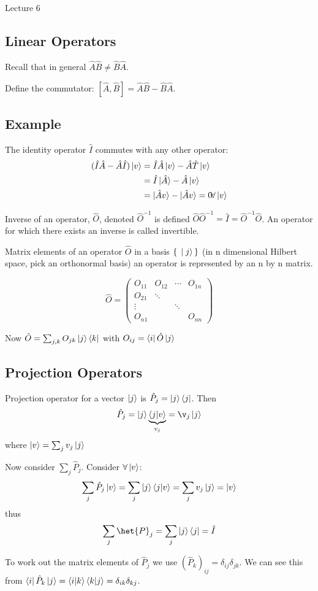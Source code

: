 \begin{center}

Lecture 6

\end{center}

\subsection{Linear Operators}

Recall that in general $\hat{A}\hat{B} \neq \hat{B}\hat{A}$.

Define the commutator: $[\hat{A}, \hat{B}] = \hat{A}\hat{B} - \hat{B}\hat{A}$.

\subsection{Example}

The identity operator $\hat{I}$ commutes with any other operator: 
\begin{align*}
(\hat{I}\hat{A} - \hat{A}\hat{I})\ket{v} &= \hat{I}\hat{A}\ket{v} - \hat{A}\hat{T}\ket{v} \\
&= \hat{I} \ket{\hat{A}} - \hat{A}\ket{v} \\
&= \ket{\hat{A} v} - \ket{\hat{A} v} = 0 \! \forall \ket{v}
\end{align*}

Inverse of an operator, $\hat{O}$, denoted $\hat{O}^{-1}$ is defined $\hat{O}\hat{O}^{-1} = \hat{I} = \hat{O}^{-1} \hat{O}$. An operator for which there exists an inverse is called invertible.

Matrix elements of an operator $\hat{O}$ in a basis $\set{\ket{j}}$ (in n dimensional Hilbert space, pick an orthonormal basis) an operator is represented by an n by n matrix.

\[\hat{O}=\begin{pmatrix}
O_{11} & O_{12} & \cdots & O_{1n} \\
O_{21} & \ddots & & \\
\vdots & & \ddots &  \\
O_{n1} & & & O_{nn}
\end{pmatrix}
\]

Now $\hat{O} = \sum_{j,k} O_{jk} \ket{j}\bra{k}$ with $O_{ij} = \bra{i}\hat{O}\ket{j}$

\subsection{Projection Operators}

Projection operator for a vector $\ket{j}$ is $\hat{P}_{j} = \ket{j} \bra{j}$. Then $$\hat{P}_j = \ket{j} \underbrace{\braket{j|v}}_{v_j} = \v_j \ket{j}$$ where $\ket{v} = \sum_j v_j \ket{j}$

Now consider $\sum_j \hat{P}_j$. Consider $\forall \ket{v}$: $$\sum_j \hat{P}_j \ket{v} = \sum_j \ket{j} \braket{j|v} = \sum_j v_j \ket{j} = \ket{v}$$ thus $$\sum_j \het{P}_j = \sum_j \ket{j}\bra{j} = \hat{I}$$

To work out the matrix elements of $\hat{P}_j$ we use $(\hat{P}_k)_{ij} = \delta_{ij}\delta_{jk}$. We can see this from $\bra{i}\hat{P}_k\ket{j} = \braket{i|k}\braket{k|j} = \delta_{ik}\delta_{kj}$.